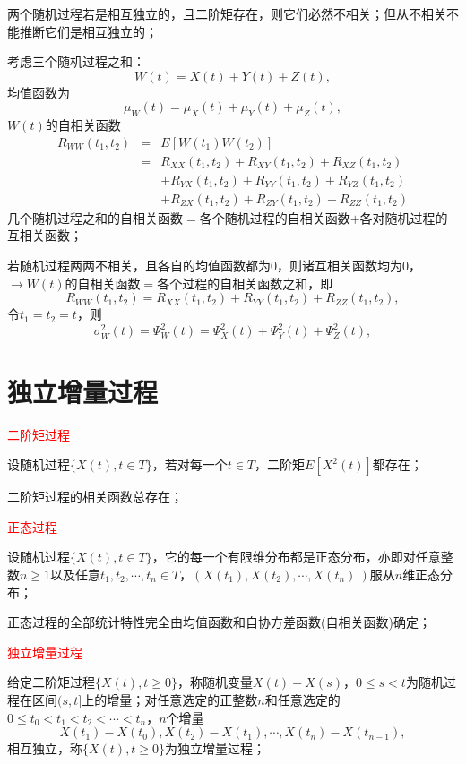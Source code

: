 \documentclass[12pt,a4paper]{article}
\begin{document}
两个随机过程若是相互独立的，且二阶矩存在，则它们必然不相关；但从不相关不能推断它们是相互独立的；

考虑三个随机过程之和：
\begin{equation}
W(t) = X(t) +Y(t) +Z(t), 
\end{equation}
均值函数为
\begin{equation}
\mu_W(t) = \mu_X(t) +\mu_Y(t) +\mu_Z(t), 
\end{equation}
$W(t)$的自相关函数
\begin{eqnarray}
\nonumber R_{WW}(t_1, t_2) &=& E[W(t_1)W(t_2)] \\
\nonumber &=& R_{XX}(t_1, t_2) +R_{XY}(t_1, t_2) +R_{XZ}(t_1, t_2) \\
\nonumber && +R_{YX}(t_1, t_2) +R_{YY}(t_1, t_2) +R_{YZ}(t_1, t_2) \\
&& +R_{ZX}(t_1, t_2) +R_{ZY}(t_1, t_2) +R_{ZZ}(t_1, t_2)
\end{eqnarray}
几个随机过程之和的自相关函数$=$各个随机过程的自相关函数$+$各对随机过程的互相关函数；

若随机过程两两不相关，且各自的均值函数都为$0$，则诸互相关函数均为$0$，$\rightarrow W(t)$的自相关函数$=$各个过程的自相关函数之和，即
\begin{equation}
R_{WW}(t_1, t_2) = R_{XX}(t_1, t_2) +R_{YY}(t_1, t_2) +R_{ZZ}(t_1, t_2),
\end{equation}
令$t_1 = t_2 = t$，则
\begin{equation}
\sigma^2_{W}(t) = \Psi^2_W(t) = \Psi^2_{X}(t) +\Psi^2_{Y}(t) +\Psi^2_{Z}(t),
\end{equation}

\section{独立增量过程}
\textcolor{red}{二阶矩过程}

设随机过程$\{X(t), t\in T\}$，若对每一个$t\in T$，二阶矩$E[X^2 (t)]$都存在；

二阶矩过程的相关函数总存在；

\textcolor{red}{正态过程}

设随机过程$\{X(t), t\in T\}$，它的每一个有限维分布都是正态分布，亦即对任意整数$n\geq 1$以及任意$t_1, t_2, \cdots, t_n\in T$，$(X(t_1), X(t_2), \cdots, X(t_n)~)$服从$n$维正态分布；

正态过程的全部统计特性完全由均值函数和自协方差函数(自相关函数)确定；

\textcolor{red}{独立增量过程}

给定二阶矩过程$\{X(t), t\geq 0\}$，称随机变量$X(t)-X(s)$，$0\leq s < t$为随机过程在区间$(s,t]$上的增量；对任意选定的正整数$n$和任意选定的$0\leq t_0 < t_1 < t_2 < \cdots < t_n$，$n$个增量
\begin{equation}
X(t_1)-X(t_0), X(t_2)-X(t_1), \cdots, X(t_n)-X(t_{n-1}),
\end{equation}
相互独立，称$\{X(t), t\geq 0 \}$为独立增量过程；
\end{document}
